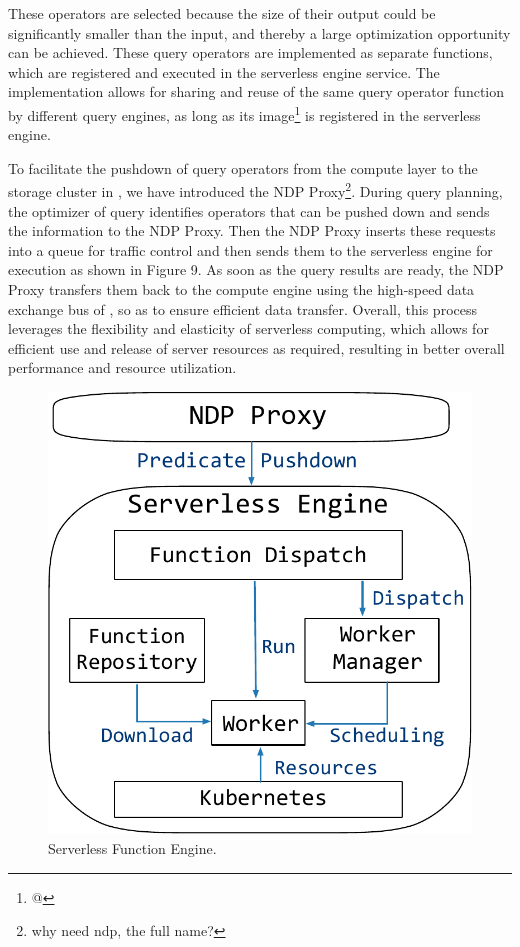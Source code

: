 These operators are selected because the size of their output could be significantly smaller than the input, and thereby a large optimization opportunity can be achieved.
These query operators are implemented as separate functions, which are registered and executed in the serverless engine service. The implementation allows for sharing and reuse of the same query operator function by different query engines, as long as its image\footnote{@} is registered in the serverless engine.


To facilitate the pushdown of query operators from the compute layer to the storage cluster in \sys, we have introduced the NDP Proxy\footnote{why need ndp, the full name?}. 
 During query planning, the optimizer of  query  identifies operators that can be pushed down and sends the information to the NDP Proxy.  Then the NDP Proxy inserts these requests into a queue for traffic control and then sends them to the serverless engine for execution as shown in Figure 9.
As soon as the query results are ready, the NDP Proxy transfers them back to the compute engine using the high-speed data exchange bus of \sys, so as to ensure efficient data transfer.
Overall,  this process leverages the flexibility and elasticity of serverless computing, which allows for efficient use and release of server resources as required, resulting in better overall performance and resource utilization.


\begin{figure}[htbp]
	\includegraphics[scale=0.35]{figures/serverless}
	\centering
	\vspace{-1em}
	\caption{Serverless Function Engine.}
	\label{fig:serverless}
	\vspace{-1em}
\end{figure}

















